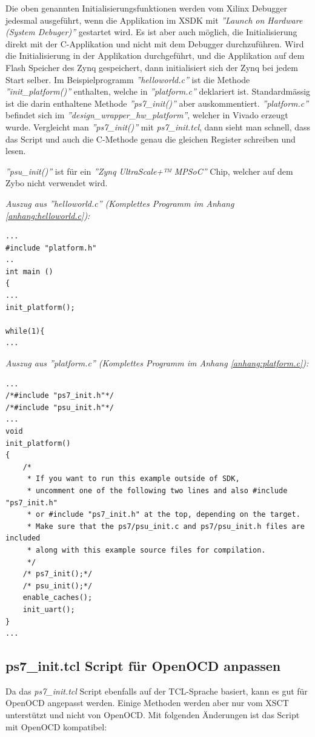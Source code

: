 Die oben genannten Initialisierungsfunktionen werden vom Xilinx Debugger jedesmal ausgeführt, wenn die Applikation im XSDK mit \textit{''Launch on Hardware (System Debuger)''} gestartet wird.
Es ist aber auch möglich, die Initialisierung direkt mit der C-Applikation und nicht mit dem Debugger durchzuführen.
Wird die Initialisierung in der Applikation durchgeführt, und die Applikation auf dem Flash Speicher des Zynq gespeichert, dann initialisiert sich der Zynq bei jedem Start selber.
Im Beispielprogramm \textit{''helloworld.c''} ist die Methode \textit{''init\_platform()''} enthalten, welche in \textit{''platform.c''} deklariert ist.
Standardmässig ist die darin enthaltene Methode \textit{''ps7\_init()''} aber auskommentiert.
\textit{''platform.c''} befindet sich im \textit{''design\_wrapper\_hw\_platform''}, welcher in Vivado erzeugt wurde.
Vergleicht man \textit{''ps7\_init()''} mit \textit{ps7\_init.tcl}, dann sieht man schnell, dass das Script und auch die C-Methode genau die gleichen Register schreiben und lesen.

\textit{''psu\_init()''} ist für ein \textit{''Zynq UltraScale+™ MPSoC''} Chip, welcher auf dem Zybo nicht verwendet wird.


\textit{Auszug aus ''helloworld.c'' (Komplettes Programm im Anhang \ref{anhang:helloworld.c}):}
\lstset{language=c}
\begin{lstlisting}[frame=single]
...
#include "platform.h"
..
int main ()
{
...
init_platform();

while(1){
...
\end{lstlisting}



\textit{Auszug aus ''platform.c'' (Komplettes Programm im Anhang \ref{anhang:platform.c}):}
\lstset{language=c}
\begin{lstlisting}[frame=single]
...
/*#include "ps7_init.h"*/
/*#include "psu_init.h"*/
...
void
init_platform()
{
    /*
     * If you want to run this example outside of SDK,
     * uncomment one of the following two lines and also #include "ps7_init.h"
     * or #include "ps7_init.h" at the top, depending on the target.
     * Make sure that the ps7/psu_init.c and ps7/psu_init.h files are included
     * along with this example source files for compilation.
     */
    /* ps7_init();*/
    /* psu_init();*/
    enable_caches();
    init_uart();
}
...

\end{lstlisting}




\subsection{ps7\_init.tcl Script für OpenOCD anpassen}
Da das \textit{ps7\_init.tcl} Script ebenfalls auf der TCL-Sprache basiert, kann es gut für OpenOCD angepasst werden.
Einige Methoden werden aber nur vom XSCT unterstützt und nicht von OpenOCD.
Mit folgenden Änderungen ist das Script mit OpenOCD kompatibel:

